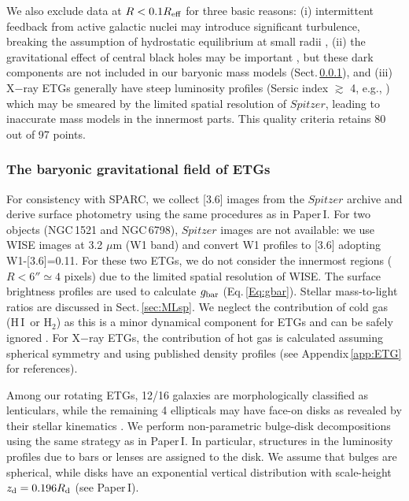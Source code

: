 \documentclass[apjl, twocolappendix]{emulateapj}
\newcommand{\hi } {{\rm H}\,{\small\rm I} \,}
\begin{document}
We also exclude data at $R < 0.1 R_{\rm eff}$ for three basic reasons: (i) intermittent feedback from active galactic nuclei may introduce significant turbulence, breaking the assumption of hydrostatic equilibrium at small radii \citep{Buote2012}, (ii) the gravitational effect of central black holes may be important \citep{Humphrey2008, Humphrey2009}, but these dark components are not included in our baryonic mass models (Sect.\,\ref{sec:barETGs}), and (iii) X$-$ray ETGs generally have steep luminosity profiles (Sersic index $\gtrsim$ 4, e.g., \citealt[][]{Kormendy2009}) which may be smeared by the limited spatial resolution of $Spitzer$, leading to inaccurate mass models in the innermost parts. This quality criteria retains 80 out of 97 points.

\subsubsection{The baryonic gravitational field of ETGs}\label{sec:barETGs}

For consistency with SPARC, we collect [3.6] images from the $Spitzer$ archive and derive surface photometry using the same procedures as in Paper\,I. For two objects (NGC\,1521 and NGC\,6798), $Spitzer$ images are not available: we use WISE images at 3.2 $\mu$m (W1 band) and convert W1 profiles to [3.6] adopting W1-[3.6]=0.11. For these two ETGs, we do not consider the innermost regions ($R<6'' \simeq 4$ pixels) due to the limited spatial resolution of WISE. The surface brightness profiles are used to calculate $g_{\rm bar}$ (Eq.\,\ref{Eq:gbar}). Stellar mass-to-light ratios are discussed in Sect.\,\ref{sec:MLsp}. We neglect the contribution of cold gas (\hi or H$_2$) as this is a minor dynamical component for ETGs and can be safely ignored \citep{Weijmans2008}. For X$-$ray ETGs, the contribution of hot gas is calculated assuming spherical symmetry and using published density profiles (see Appendix\,\ref{app:ETG} for references).

Among our rotating ETGs, 12/16 galaxies are morphologically classified as lenticulars, while the remaining 4 ellipticals may have face-on disks as revealed by their stellar kinematics \citep[see e.g.,][]{Cappellari2016}. We perform non-parametric bulge-disk decompositions using the same strategy as in Paper\,I. In particular, structures in the luminosity profiles due to bars or lenses are assigned to the disk. We assume that bulges are spherical, while disks have an exponential vertical distribution with scale-height $z_{\rm d} = 0.196 R_{\rm d}$ (see Paper\,I).
\end{document}
